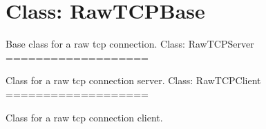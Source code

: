 %
%

\hypertarget{qconnectbase-tcp/raw-raw-tcp-class-rawtcpbase-60}{%
\section{Class: RawTCPBase}\label{qconnectbase-tcp/raw-raw-tcp-class-rawtcpbase-60}}

\begin{Shaded}
\begin{Highlighting}[]
\OperatorTok{/}
\end{Highlighting}
\end{Shaded}

Base class for a raw tcp connection. Class: RawTCPServer
===================

\begin{Shaded}
\begin{Highlighting}[]
\OperatorTok{/}
\end{Highlighting}
\end{Shaded}

Class for a raw tcp connection server. Class: RawTCPClient
===================

\begin{Shaded}
\begin{Highlighting}[]
\OperatorTok{/}
\end{Highlighting}
\end{Shaded}

Class for a raw tcp connection client.
